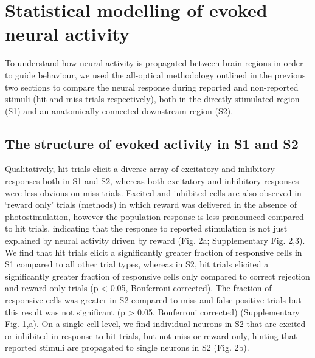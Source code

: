 \chapter{\label{res3}Statistical modelling of evoked neural activity
}

\minitoc

To understand how neural activity is propagated between brain regions in order to guide behaviour, we used the all-optical methodology outlined in the previous two sections to compare the neural response during reported and non-reported stimuli (hit and miss trials respectively), both in the directly stimulated region (S1) and an anatomically connected downstream region (S2). 

\section{The structure of evoked activity in S1 and S2}

Qualitatively, hit trials elicit a diverse array of excitatory and inhibitory responses both in S1 and S2, whereas both excitatory and inhibitory responses were less obvious on miss trials. Excited and inhibited cells are also observed in ‘reward only’ trials (methods) in which reward was delivered in the absence of photostimulation, however the population response is less pronounced compared to hit trials, indicating that the response to reported stimulation is not just explained by neural activity driven by reward (Fig. 2a; Supplementary Fig. 2,3). We find that hit trials elicit a significantly greater fraction of responsive cells in S1 compared to all other trial types, whereas in S2, hit trials elicited a significantly greater fraction of responsive cells only compared to correct rejection and reward only trials (p < 0.05, Bonferroni corrected). The fraction of responsive cells was greater in S2 compared to miss and false positive trials but this result was not significant (p > 0.05, Bonferroni corrected) (Supplementary Fig. 1,a). On a single cell level, we find individual neurons in S2 that are excited or inhibited in response to hit trials, but not miss or reward only, hinting that reported stimuli are propagated to single neurons in S2 (Fig. 2b).

